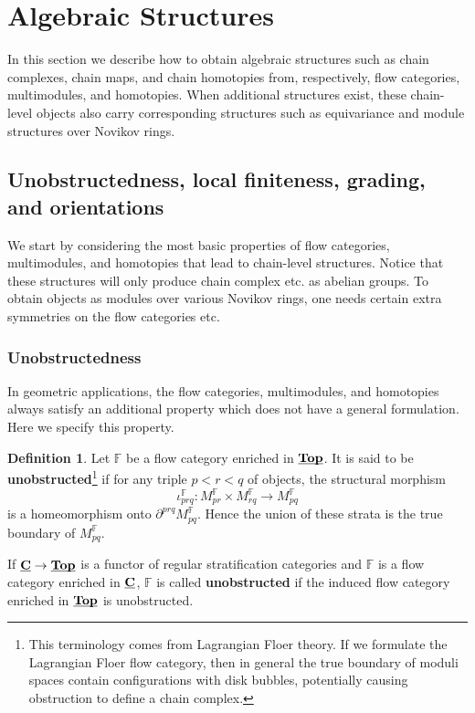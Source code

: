 \documentclass[reqno, 10pt]{amsart}
\numberwithin{equation}{section}
\numberwithin{equation}{section}
\theoremstyle{definition}
\newtheorem{defn}[thm]{Definition}
\theoremstyle{remark}
\newcommand{\beqn}{\begin{equation*}}
\newcommand{\eeqn}{\end{equation*}}
\newcommand{\mb}{\mathbb}
\newcommand{\uds}[1]{\underline{\smash{#1}}}
\begin{document}
\section{Algebraic Structures}\label{section6}\label{section_algebraic}

In this section we describe how to obtain algebraic structures such as chain complexes, chain maps, and chain homotopies from, respectively, flow categories, multimodules, and homotopies. When additional structures exist, these chain-level objects also carry corresponding structures such as equivariance and module structures over Novikov rings.


\subsection{Unobstructedness, local finiteness, grading, and orientations}

We start by considering the most basic properties of flow categories, multimodules, and homotopies that lead to chain-level structures. Notice that these structures will only produce chain complex etc. as abelian groups. To obtain objects as modules over various Novikov rings, one needs certain extra symmetries on the flow categories etc.

\subsubsection{Unobstructedness}


In geometric applications, the flow categories, multimodules, and homotopies always satisfy an additional property which does not have a general formulation. Here we specify this property.

\begin{defn}\label{defn_unobstructed}
Let ${\mb F}$ be a flow category enriched in $\uds{\bf Top}$. It is said to be {\bf unobstructed}\footnote{This terminology comes from Lagrangian Floer theory. If we formulate the Lagrangian Floer flow category, then in general the true boundary of moduli spaces contain configurations with disk bubbles, potentially causing obstruction to define a chain complex.} if for any triple $p < r < q$ of objects, the structural morphism
\beqn
\iota_{prq}^{\mb F}: M_{pr}^{\mb F} \times M_{rq}^{\mb F} \to M_{pq}^{\mb F}
\eeqn
is a homeomorphism onto $\partial^{prq} M_{pq}^{\mb F}$. Hence the union of these strata is the true boundary of $M_{pq}^{\mb F}$.

If $\uds{{\bf C}} \to \uds{\bf Top}$ is a functor of regular stratification categories and ${\mb F}$ is a flow category enriched in $\uds{\bf C}$, ${\mb F}$ is called {\bf unobstructed} if the induced flow category enriched in $\uds{\bf Top}$ is unobstructed.
\end{defn}
\end{document}
